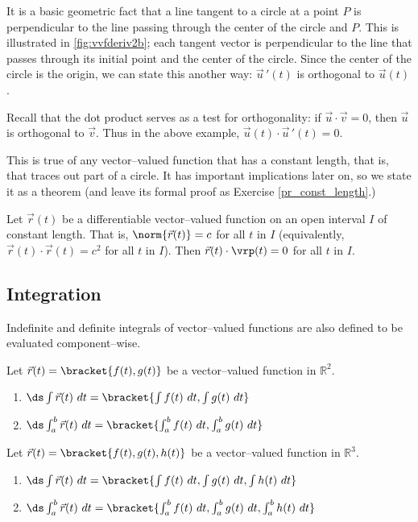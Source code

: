 It is a basic geometric fact that a line tangent to a circle at a point $P$ is perpendicular to the line passing through the center of the circle and $P$. This is illustrated in \autoref{fig:vvfderiv2b}; each tangent vector is perpendicular to the line that passes through its initial point and the center of the circle. Since the center of the circle is the origin, we can state this another way: $\vec u\,'(t)$ is orthogonal to $\vec u(t)$.

Recall that the dot product serves as a test for orthogonality: if $\vec u\cdot \vec v = 0$, then $\vec u$ is orthogonal to $\vec v$. Thus in the above example, $\vec u(t)\cdot \vec u\,'(t)=0$.

This is true of any vector--valued function that has a constant length, that is, that traces out part of a circle. It has important implications later on, so we state it as a theorem (and leave its formal proof as Exercise \ref{pr_const_length}.)

{Let $\vec r(t)$ be a differentiable vector--valued function on an open interval $I$ of constant length. That is, $\norm{\vec r(t)} = c$ for all $t$ in $I$ (equivalently, $\vec r(t)\cdot \vec r(t) = c^2$ for all $t$ in $I$). 
Then $\vec r(t)\cdot\vrp(t) = 0$ for all $t$ in $I$.}

\subsection*{Integration}

Indefinite and definite integrals of vector--valued functions are also defined to be evaluated component--wise.

{Let $\vec r(t) =\bracket{f(t),g(t)}$ be a vector--valued function in $\mathbb{R}^2$.
\begin{enumerate}
	\item $\ds \int \vec r(t)\ dt =\bracket{\int f(t)\ dt, \int g(t)\ dt}$
	\item	$\ds \int_a^b \vec r(t)\ dt =\bracket{\int_a^b f(t)\ dt, \int_a^b g(t)\ dt}$
\end{enumerate}
Let $\vec r(t) =\bracket{f(t),g(t),h(t)}$ be a vector--valued function in $\mathbb{R}^3$.
\begin{enumerate}
	\item $\ds \int \vec r(t)\ dt =\bracket{\int f(t)\ dt, \int g(t)\ dt, \int h(t)\ dt}$
	\item	$\ds \int_a^b \vec r(t)\ dt =\bracket{\int_a^b f(t)\ dt, \int_a^b g(t)\ dt, \int_a^b h(t)\ dt}$
\end{enumerate}}

